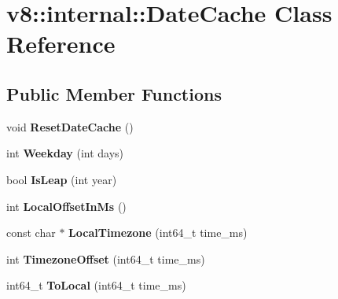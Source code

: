 \hypertarget{classv8_1_1internal_1_1_date_cache}{}\section{v8\+:\+:internal\+:\+:Date\+Cache Class Reference}
\label{classv8_1_1internal_1_1_date_cache}
\subsection*{Public Member Functions}
\begin{DoxyCompactItemize}
\item 
\hypertarget{classv8_1_1internal_1_1_date_cache_a234d6747df82eeccae3686cc030d6877}{}void {\bfseries Reset\+Date\+Cache} ()\label{classv8_1_1internal_1_1_date_cache_a234d6747df82eeccae3686cc030d6877}

\item 
\hypertarget{classv8_1_1internal_1_1_date_cache_aa83122db4a93e0492adaad825749a689}{}int {\bfseries Weekday} (int days)\label{classv8_1_1internal_1_1_date_cache_aa83122db4a93e0492adaad825749a689}

\item 
\hypertarget{classv8_1_1internal_1_1_date_cache_a215a3a32269cfc00a9f682acaf52593c}{}bool {\bfseries Is\+Leap} (int year)\label{classv8_1_1internal_1_1_date_cache_a215a3a32269cfc00a9f682acaf52593c}

\item 
\hypertarget{classv8_1_1internal_1_1_date_cache_a1705ad54413c08e5a8fd1e7e0588b022}{}int {\bfseries Local\+Offset\+In\+Ms} ()\label{classv8_1_1internal_1_1_date_cache_a1705ad54413c08e5a8fd1e7e0588b022}

\item 
\hypertarget{classv8_1_1internal_1_1_date_cache_a72f75a025482ea24097a84680ea692e6}{}const char $\ast$ {\bfseries Local\+Timezone} (int64\+\_\+t time\+\_\+ms)\label{classv8_1_1internal_1_1_date_cache_a72f75a025482ea24097a84680ea692e6}

\item 
\hypertarget{classv8_1_1internal_1_1_date_cache_acdfa35aaa92db20cffd304ffb6bf1e45}{}int {\bfseries Timezone\+Offset} (int64\+\_\+t time\+\_\+ms)\label{classv8_1_1internal_1_1_date_cache_acdfa35aaa92db20cffd304ffb6bf1e45}

\item 
\hypertarget{classv8_1_1internal_1_1_date_cache_a8deadbe8d0a827ed155d396ef3c4e164}{}int64\+\_\+t {\bfseries To\+Local} (int64\+\_\+t time\+\_\+ms)\label{classv8_1_1internal_1_1_date_cache_a8deadbe8d0a827ed155d396ef3c4e164}


\end{DoxyCompactItemize}
